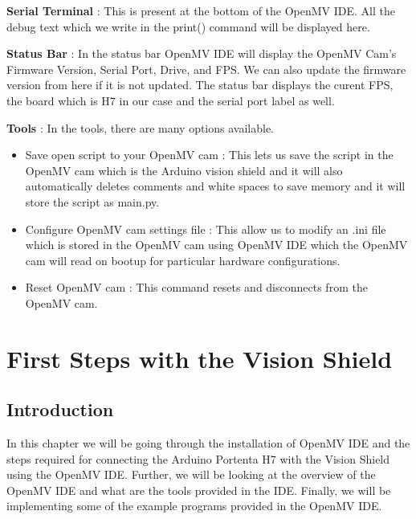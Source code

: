 \textbf{Serial Terminal} :
This is present at the bottom of the OpenMV IDE. All the debug text which we write in the print() command will be displayed here.

\textbf{Status Bar} :
In the status bar OpenMV IDE will display the OpenMV Cam’s Firmware Version, Serial Port, Drive, and FPS. We can also update the firmware version from here if it is not updated. The status bar displays the curent FPS, the board which is H7 in our case and the serial port label as well.

\textbf{Tools} :
In the tools, there are many options available.
\begin{itemize}
\vspace{-0.6mm}
	\item Save open script to your OpenMV cam : This lets us save the script in the OpenMV cam which is the Arduino vision shield and it will also automatically deletes comments and white spaces to save memory and it will store the script as main.py.
	\vspace{-0.6mm}
	\item Configure OpenMV cam settings file : This allow us to modify an .ini file which is stored in the OpenMV cam using OpenMV IDE which the OpenMV cam will read on bootup for particular hardware configurations.
	\vspace{-0.6mm}
	\item Reset OpenMV cam : This command resets and disconnects from the OpenMV cam.
	\vspace{-0.6mm}
\end{itemize} 






\chapter{First Steps with the Vision Shield}

\section{Introduction}

In this chapter we will be going through the installation of OpenMV IDE and the steps required for connecting the Arduino Portenta H7 with the Vision Shield using the OpenMV IDE. Further, we will be looking at the overview of the OpenMV IDE and what are the tools provided in the IDE.  Finally, we will be implementing some of the example programs provided in the OpenMV IDE.


